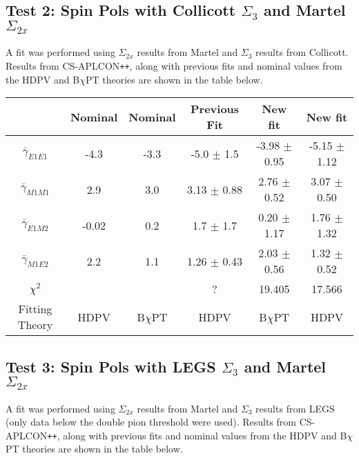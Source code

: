 \documentclass[]{article}
\begin{document}
\newpage

\subsection{Test 2: Spin Pols with Collicott $\Sigma_{3}$ and Martel $\Sigma_{2x}$}\label{Section:CollicottTest}

A fit was performed using $\Sigma_{2x}$ results from Martel and $\Sigma_{3}$ results from Collicott. Results from CS-APLCON\texttt{++}, along with previous fits and nominal values from the HDPV and B$\chi$PT theories are shown in the table below.

\begin{table}[h!]
	\centering %
	\begin{tabular}{|c|cc|c|c|c|} %
		\hline
		& Nominal & Nominal & Previous Fit & New fit & New fit\\
		\hline %
		$\bar{\gamma}_{E1E1}$ & -4.3 & -3.3 & -5.0 $\pm$ 1.5  & -3.98 $\pm$ 0.95 & -5.15 $\pm$ 1.12 \\ 
		$\bar{\gamma}_{M1M1}$ & 2.9 & 3.0   & 3.13 $\pm$ 0.88 &  2.76 $\pm$ 0.52 & 3.07 $\pm$ 0.50\\
		$\bar{\gamma}_{E1M2}$ & -0.02 & 0.2 & 1.7 $\pm$ 1.7   &  0.20 $\pm$ 1.17 & 1.76 $\pm$ 1.32\\
		$\bar{\gamma}_{M1E2}$ & 2.2 & 1.1   & 1.26 $\pm$ 0.43 &  2.03 $\pm$ 0.56 & 1.32 $\pm$ 0.52\\[0.5ex]
				$\chi^{2}$    &     &       &  ?              & 19.405 & 17.566 \\		
		\hline
		Fitting Theory & HDPV & B$\chi$PT & HDPV & B$\chi$PT& HDPV\\
		\hline
	\end{tabular}
\end{table}

\subsection{Test 3: Spin Pols with LEGS $\Sigma_{3}$ and Martel $\Sigma_{2x}$}\label{Section:LEGSTest}

A fit was performed using $\Sigma_{2x}$ results from Martel and $\Sigma_{3}$ results from LEGS (only data below the double pion threshold were used). Results from CS-APLCON\texttt{++}, along with previous fits and nominal values from the HDPV and B$\chi$PT theories are shown in the table below.
\end{document}
